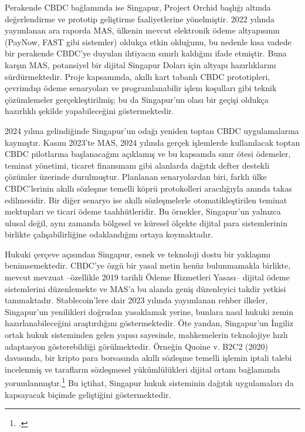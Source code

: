 \documentclass[a4paper,12pt]{article}
\begin{document}
Perakende CBDC bağlamında ise Singapur, Project Orchid başlığı altında değerlendirme ve prototip geliştirme faaliyetlerine yönelmiştir. 2022 yılında yayımlanan ara raporda MAS, ülkenin mevcut elektronik ödeme altyapısının (PayNow, FAST gibi sistemler) oldukça etkin olduğunu, bu nedenle kısa vadede bir perakende CBDC’ye duyulan ihtiyacın sınırlı kaldığını ifade etmiştir. Buna karşın MAS, potansiyel bir dijital Singapur Doları için altyapı hazırlıklarını sürdürmektedir. Proje kapsamında, akıllı kart tabanlı CBDC prototipleri, çevrimdışı ödeme senaryoları ve programlanabilir işlem koşulları gibi teknik çözümlemeler gerçekleştirilmiş; bu da Singapur’un olası bir geçişi oldukça hazırlıklı şekilde yapabileceğini göstermektedir.

2024 yılına gelindiğinde Singapur’un odağı yeniden toptan CBDC uygulamalarına kaymıştır. Kasım 2023’te MAS, 2024 yılında gerçek işlemlerde kullanılacak toptan CBDC pilotlarına başlanacağını açıklamış ve bu kapsamda sınır ötesi ödemeler, teminat yönetimi, ticaret finansmanı gibi alanlarda dağıtık defter destekli çözümler üzerinde durulmuştur. Planlanan senaryolardan biri, farklı ülke CBDC’lerinin akıllı sözleşme temelli köprü protokolleri aracılığıyla anında takas edilmesidir. Bir diğer senaryo ise akıllı sözleşmelerle otomatikleştirilen teminat mektupları ve ticari ödeme taahhütleridir. Bu örnekler, Singapur’un yalnızca ulusal değil, aynı zamanda bölgesel ve küresel ölçekte dijital para sistemlerinin birlikte çalışabilirliğine odaklandığını ortaya koymaktadır.

Hukuki çerçeve açısından Singapur, esnek ve teknoloji dostu bir yaklaşımı benimsemektedir. CBDC’ye özgü bir yasal metin henüz bulunmamakla birlikte, mevcut mevzuat –özellikle 2019 tarihli Ödeme Hizmetleri Yasası– dijital ödeme sistemlerini düzenlemekte ve MAS’a bu alanda geniş düzenleyici takdir yetkisi tanımaktadır. Stablecoin’lere dair 2023 yılında yayımlanan rehber ilkeler, Singapur’un yenilikleri doğrudan yasaklamak yerine, bunlara nasıl hukuki zemin hazırlanabileceğini araştırdığını göstermektedir. Öte yandan, Singapur'un İngiliz ortak hukuk sisteminden gelen yapısı sayesinde, mahkemelerin teknolojiye hızlı adaptasyon gösterebildiği görülmektedir. Örneğin Quoine v. B2C2 (2020) davasında, bir kripto para borsasında akıllı sözleşme temelli işlemin iptali talebi incelenmiş ve tarafların sözleşmesel yükümlülükleri dijital ortam bağlamında yorumlanmıştır.\footcite{quoine2020case} Bu içtihat, Singapur hukuk sisteminin dağıtık uygulamaları da kapsayacak biçimde geliştiğini göstermektedir.
\end{document}
